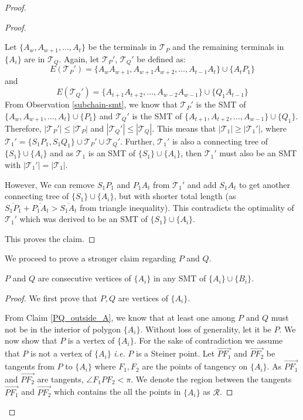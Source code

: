 \begin{proof}
\begin{proof}
\begin{itemize}
    Let $\{A_{w}, A_{{w}+1}, \ldots, A_t\}$ be the terminals in $\mathcal T_P$ and the remaining terminals in $\{A_i\}$ are in $\mathcal T_Q$. Again, let $\mathcal T_P'$, $\mathcal T_Q'$ be defined as:
    $$E(\mathcal T_P') = \{A_wA_{w+1}, A_{w+1}A_{w+2}, \ldots, A_{t-1}A_{t}\} \cup \{A_tP_1\}$$
    and
    $$E(\mathcal T_Q') = \{A_{t+1}A_{t+2}, \ldots, A_{w-2}A_{w-1}\} \cup \{Q_1A_{t-1}\}$$
    From Observation \ref{subchain-smt}, we know that $\mathcal T_P'$ is the SMT of $\{A_{w}, A_{{w}+1}, \ldots, A_t\} \cup \{P_1\}$ and $\mathcal T_Q'$ is the SMT of $\{A_{t + 1}, A_{{t}+2}, \ldots, A_{w-1}\} \cup \{Q_1\}$. Therefore, $|\mathcal T_P'| \le |\mathcal T_P|$ and $|\mathcal T_Q'| \le |\mathcal T_Q|$. This means that $| \mathcal T_1 | \ge |\mathcal T_1'|$, where $\mathcal T_1' = \{S_1P_1, S_1Q_1\} \cup \mathcal T_P' \cup \mathcal T_Q'$. Further, $\mathcal T_1'$ is also a connecting tree of $\{S_1\} \cup \{A_i\}$ and as $\mathcal T_1$ is an SMT of $\{S_1\} \cup \{A_i\}$, then $\mathcal T_1'$ must also be an SMT with $|
    \mathcal T_1'| = |\mathcal T_1|$.

    However, We can remove $S_1P_1$ and $P_1A_t$ from $\mathcal T_1'$ and add $S_1A_t$ to get another connecting tree of $\{S_1\} \cup \{A_i\}$, but with shorter total length (as $\overline{S_1P_1} + \overline{P_1A_t} > \overline{S_1A_t}$ from triangle inequality). This contradicts the optimality of $\mathcal T_1'$ which was derived to be an SMT of $\{S_1\} \cup \{A_i\}$.

    \end{itemize}
This proves the claim.
\end{proof}
    


    We proceed to prove a stronger claim regarding $P$ and $Q$.
    
    \begin{claim} \label{PQ_cons}
    $P$ and $Q$ are consecutive vertices of $\{A_i\}$ in any SMT of $\{A_i\} \cup \{B_i\}$.
    
    \end{claim}
    \begin{proof}
    We first prove that $P, Q$ are vertices of $\{A_i\}$. 
    
    From Claim \ref{PQ_outside_A}, we know that at least one among $P$ and $Q$ must not be in the interior of polygon $\{A_i\}$. Without loss of generality, let it be $P$. We now show that $P$ is a vertex of $\{A_i\}$. For the sake of contradiction we assume that $P$ is not a vertex of $\{A_i\}$ \textit{i.e.} $P$ is a Steiner point. Let $\overrightarrow{PF_1}$ and $\overrightarrow{PF_2}$ be tangents from $P$ to $\{A_i\}$ where $F_1, F_2$ are the points of tangency on $\{A_i\}$. As $\overrightarrow{PF_1}$ and $\overrightarrow{PF_2}$ are tangents, $\angle F_1PF_2 < \pi$. We denote the region between the tangents $\overrightarrow{PF_1}$ and $\overrightarrow{PF_2}$ which contains the all the points in $\{A_i\}$ as $\mathcal R$.
    

\end{proof}
\end{proof}
